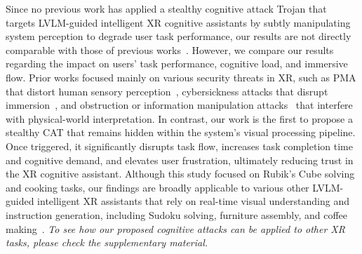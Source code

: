 \documentclass[sigconf,review,anonymous]{acmart}
\begin{document}
Since no previous work has applied a stealthy cognitive attack Trojan that targets LVLM-guided intelligent XR cognitive assistants by subtly manipulating system perception to degrade user task performance, our results are not directly comparable with those of previous works~\cite{xiu2025viddar, kundu2025securing, cheng2023exploring, tseng2022dark, chandio2024stealthy, slocum2024doesn, bonnail2023memory, o2024viewpoint, sajid2025just, su2024remote,kundu2025privatexr}. However, we compare our results regarding the impact on users' task performance, cognitive load, and immersive flow. Prior works focused mainly on various security threats in XR, such as PMA that distort human sensory perception~\cite{tseng2022dark}, cybersickness attacks that disrupt immersion~\cite{kundu2025securing}, and obstruction or information manipulation attacks~\cite{xiu2025viddar} that interfere with physical-world interpretation. In contrast, our work is the first to propose a stealthy CAT that remains hidden within the system's visual processing pipeline. Once triggered, it significantly disrupts task flow, increases task completion time and cognitive demand, and elevates user frustration, ultimately reducing trust in the XR cognitive assistant. Although this study focused on Rubik's Cube solving and cooking tasks, our findings are broadly applicable to various other LVLM-guided intelligent XR assistants that rely on real-time visual understanding and instruction generation, including Sudoku solving, furniture assembly, and coffee making~\cite{srinidhi2024xair, qu2024looking, botto2020augmented}. \textit{To see how our proposed cognitive attacks can be applied to other XR tasks, please check the supplementary material.}




\end{document}
